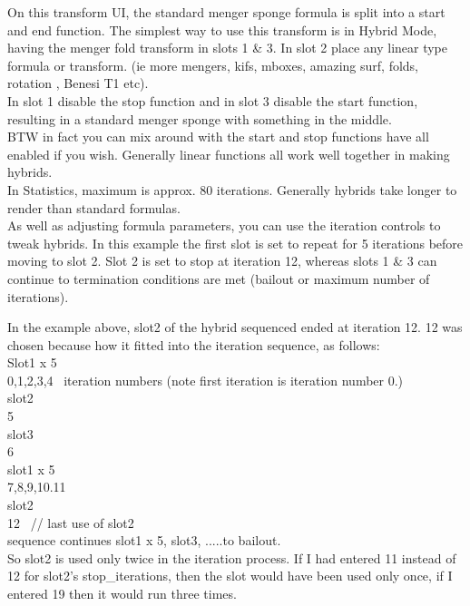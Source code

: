 On this transform UI, the standard menger sponge formula is split into a
start and end function. The simplest way to use this transform is in
Hybrid Mode, having the menger fold transform in slots 1 \& 3. In slot 2
place any linear type formula or transform. (ie more mengers, kifs,
mboxes, amazing surf, folds, rotation , Benesi T1
etc).\\[2\baselineskip]In slot 1 disable the stop function and in slot 3
disable the start function, resulting in a standard menger sponge with
something in the middle.\\[2\baselineskip]BTW in fact you can mix around
with the start and stop functions have all enabled if you wish.
Generally linear functions all work well together in making
hybrids.\\[2\baselineskip]In Statistics, maximum is approx. 80
iterations. Generally hybrids take longer to render than standard
formulas.\\[2\baselineskip]As well as adjusting formula parameters, you
can use the iteration controls to tweak hybrids. In this example the
first slot is set to repeat for 5 iterations before moving to slot 2.
Slot 2 is set to stop at iteration 12, whereas slots 1 \& 3 can continue
to termination conditions are met (bailout or maximum number of
iterations).

In the example above, slot2 of the hybrid sequenced ended at iteration
12. 12 was chosen because how it fitted into the iteration sequence, as
follows:\\[2\baselineskip]Slot1 x 5\\
0,1,2,3,4~ iteration numbers (note first iteration is iteration number
0.)\\[2\baselineskip]slot2\\
5\\[2\baselineskip]slot3~\\
6\\[2\baselineskip]slot1 x 5\\
7,8,9,10.11\\[2\baselineskip]slot2\\
12~ // last use of slot2\\[2\baselineskip]\hspace*{0.333em}sequence
continues slot1 x 5, slot3, .....to bailout.\\[2\baselineskip]So slot2
is used only twice in the iteration process. If I had entered 11 instead
of 12 for slot2's stop\_iterations, then the slot would have been used
only once, if I entered 19 then it would run three times.

